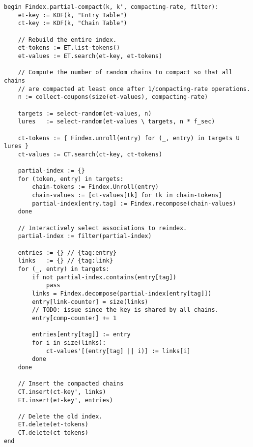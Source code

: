 \documentclass[11pt]{article}
\begin{document}
\begin{verbatim}
begin Findex.partial-compact(k, k', compacting-rate, filter):
    et-key := KDF(k, "Entry Table")
    ct-key := KDF(k, "Chain Table")

    // Rebuild the entire index.
    et-tokens := ET.list-tokens()
    et-values := ET.search(et-key, et-tokens)

    // Compute the number of random chains to compact so that all chains
    // are compacted at least once after 1/compacting-rate operations.
    n := collect-coupons(size(et-values), compacting-rate)

    targets := select-random(et-values, n)
    lures   := select-random(et-values \ targets, n * f_sec)

    ct-tokens := { Findex.unroll(entry) for (_, entry) in targets U lures }
    ct-values := CT.search(ct-key, ct-tokens)

    partial-index := {}
    for (token, entry) in targets:
        chain-tokens := Findex.Unroll(entry)
        chain-values := [ct-values[tk] for tk in chain-tokens]
        partial-index[entry.tag] := Findex.recompose(chain-values)
    done

    // Interactively select associations to reindex.
    partial-index := filter(partial-index)

    entries := {} // {tag:entry}
    links   := {} // {tag:link}
    for (_, entry) in targets:
        if not partial-index.contains(entry[tag])
            pass
        links = Findex.decompose(partial-index[entry[tag]])
        entry[link-counter] = size(links)
        // TODO: issue since the key is shared by all chains.
        entry[comp-counter] += 1

        entries[entry[tag]] := entry
        for i in size(links):
            ct-values'[(entry[tag] || i)] := links[i]
        done
    done

    // Insert the compacted chains
    CT.insert(ct-key', links)
    ET.insert(et-key', entries)

    // Delete the old index.
    ET.delete(et-tokens)
    CT.delete(ct-tokens)
end
\end{verbatim}
\end{document}
